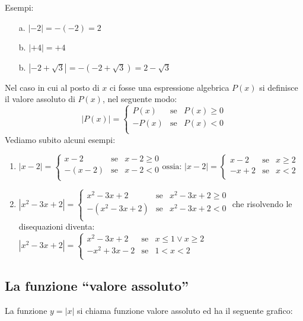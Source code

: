 Esempi:
\begin{enumerate}
\item[a.]
$|-2|=-(-2)=2$
\item[b.]
$|+4|=+4$
\item[b.]
$|-2+\sqrt{3}|=-(-2+\sqrt{3})=2-\sqrt{3}$
\end{enumerate} 
Nel caso in cui al posto di $x$ ci fosse una espressione algebrica  $P(x)$ si 
definisce il valore assoluto di $P(x)$, nel seguente modo:
$$|P(x)|=\left\lbrace 
\begin{array}{lcl}
P(x) & \text{se} & P(x)\geq 0 \\
-P(x) & \text{se} & P(x)< 0 \\
\end{array}
\right. 
$$
Vediamo subito alcuni esempi:
\begin{enumerate}
\item
$|x-2|=\left\lbrace 
\begin{array}{lcl}
x-2 & \text{se} & x-2\geq 0 \\
-(x-2) & \text{se} & x-2< 0 \\
\end{array}
\right.
\text{ossia: }
|x-2|=\left\lbrace 
\begin{array}{lcl}
x-2 & \text{se} & x\geq 2 \\
-x+2 & \text{se} & x<2 \\
\end{array}
\right.
$
\item
$|x^2-3x+2|=\left\lbrace 
\begin{array}{lcl}
x^2-3x+2 & \text{se} & x^2-3x+2\geq 0 \\
-(x^2-3x+2) & \text{se} & x^2-3x+2< 0 \\
\end{array}
\right.$
che risolvendo le disequazioni diventa:\\
$
|x^2-3x+2|=\left\lbrace 
\begin{array}{lcl}
x^2-3x+2 & \text{se} & x\leq 1 \vee x\geq 2 \\
-x^2+3x-2 & \text{se} & 1<x<2 \\
\end{array}
\right.
$
\end{enumerate}
\subsection{La funzione ``valore assoluto''}
La funzione $y=|x|$ si chiama funzione valore assoluto ed ha il seguente 
grafico:

